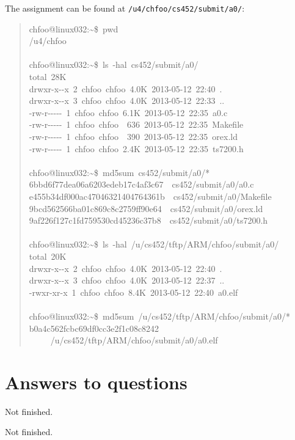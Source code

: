 \documentclass[letterpaper]{article}
\begin{document}
The assignment can be found at \texttt{/u4/chfoo/cs452/submit/a0/}:
%
\begin{quote}{\ttfamily \raggedright \noindent
chfoo@linux032:\textasciitilde{}\$~pwd\\
/u4/chfoo\\
~\\
chfoo@linux032:\textasciitilde{}\$~ls~-hal~cs452/submit/a0/\\
total~28K\\
drwxr-x-{}-x~2~chfoo~chfoo~4.0K~2013-05-12~22:40~.\\
drwxr-x-{}-x~3~chfoo~chfoo~4.0K~2013-05-12~22:33~..\\
-rw-r-{}-{}-{}-{}-~1~chfoo~chfoo~6.1K~2013-05-12~22:35~a0.c\\
-rw-r-{}-{}-{}-{}-~1~chfoo~chfoo~~636~2013-05-12~22:35~Makefile\\
-rw-r-{}-{}-{}-{}-~1~chfoo~chfoo~~390~2013-05-12~22:35~orex.ld\\
-rw-r-{}-{}-{}-{}-~1~chfoo~chfoo~2.4K~2013-05-12~22:35~ts7200.h\\
~\\
chfoo@linux032:\textasciitilde{}\$~md5sum~cs452/submit/a0/*\\
6bbd6f77dea06a6203edeb17c4af3c67~~cs452/submit/a0/a0.c\\
e455b34df000ac47046321404764361b~~cs452/submit/a0/Makefile\\
9bcd562566ba01c869c8c2759ff90e64~~cs452/submit/a0/orex.ld\\
9af226f127c1fd759530cd45236c37b8~~cs452/submit/a0/ts7200.h\\
~\\
chfoo@linux032:\textasciitilde{}\$~ls~-hal~/u/cs452/tftp/ARM/chfoo/submit/a0/\\
total~20K\\
drwxr-x-{}-x~2~chfoo~chfoo~4.0K~2013-05-12~22:40~.\\
drwxr-x-{}-x~3~chfoo~chfoo~4.0K~2013-05-12~22:37~..\\
-rwxr-xr-x~1~chfoo~chfoo~8.4K~2013-05-12~22:40~a0.elf\\
~\\
chfoo@linux032:\textasciitilde{}\$~md5sum~/u/cs452/tftp/ARM/chfoo/submit/a0/*\\
b0a4c562fcbc69df0cc3e2f1c08c8242\\
~~~~~/u/cs452/tftp/ARM/chfoo/submit/a0/a0.elf
}
\end{quote}


\section{Answers to questions%
  \label{answers-to-questions}%
}
\setcounter{listcnt0}{0}
\begin{list}{.}
{
\setlength{\rightmargin}{\leftmargin}
}

\item Not finished.

\item Not finished.
\end{list}
\end{document}

